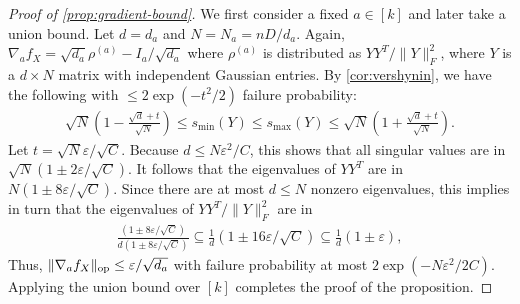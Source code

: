 \documentclass{article}
\DeclarePairedDelimiter{\norm}{\lVert}{\rVert}
\newcommand{\op}{\operatorname{op}}
\newcommand\eps{\varepsilon}
\newcommand\cN{\mathcal{N}}
\newcommand\samp{x}
\newcommand\rv{X}
\newcommand{\CF}[1]{{\color{purple}[CF: #1]}}
\begin{document}
\begin{proof}[Proof of \cref{prop:gradient-bound}]
We first consider a fixed $a\in[k]$ and later take a union bound.
Let $d = d_a$ and $N = N_a = n D/d_a$.
Again, $\nabla_a f_{\rv} = \sqrt{d_a} \rho^{(a)} - I_a/\sqrt{d_a}$ where $\rho^{(a)}$ is distributed as $Y Y^T/\|Y\|_F^2$, where $Y$ is a $d \times N$ matrix with independent Gaussian entries.
By \cref{cor:vershynin}, we have the following with $\leq 2 \exp(-t^2/2)$ failure probability:
\begin{align*}
  \sqrt{N} \left( 1 -  \frac{\sqrt{d} + t }{\sqrt{N}}  \right)\leq s_{\min}(Y) \leq s_{\max}(Y) \leq  \sqrt{N} \left( 1 + \frac{\sqrt{d} + t }{\sqrt{N}} \right).
\end{align*}
Let $t = \sqrt{N} \eps / \sqrt{C}$.
Because $d \leq N \eps^2 / C$, this shows that all singular values are in $\sqrt{N} \left( 1 \pm 2\eps/\sqrt{C} \right)$.
It follows that the eigenvalues of $YY^T$ are in $N \left( 1 \pm 8\eps/\sqrt{C} \right)$.
Since there are at most $d \leq N$ nonzero eigenvalues, this implies in turn that the eigenvalues of $Y Y^T/\|Y\|_F^2$ are in
\begin{align*}
\frac {\left( 1 \pm 8\eps/\sqrt{C} \right)} {d \left( 1 \pm 8\eps/\sqrt{C} \right)} \subseteq \frac1d \left( 1 \pm 16\eps/\sqrt{C} \right) \subseteq \frac1d \left( 1 \pm \eps \right),
\end{align*}
Thus,
$\norm{\nabla_a f_{\rv}}_{\op} \leq \eps/\sqrt{d_a}$
with failure probability at most $2 \exp(-N \eps^2/2C)$.
Applying the union bound over $[k]$ completes the proof of the proposition.
\end{proof}

\end{document}
